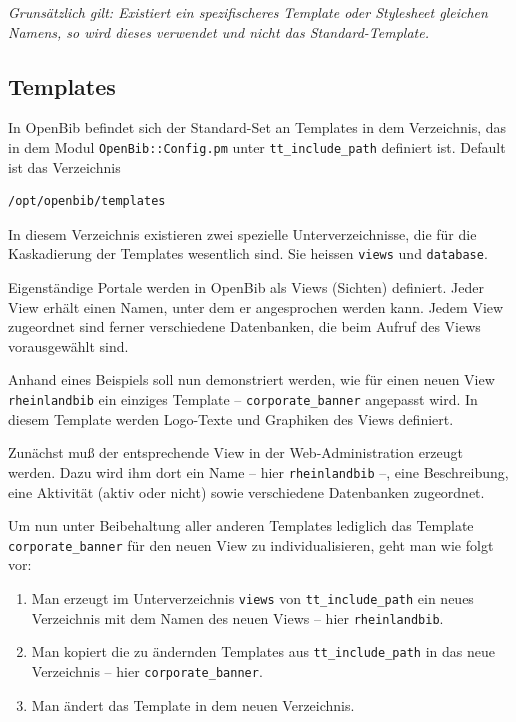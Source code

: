 \documentclass[11pt, twoside, a4paper, BCOR8mm, DIV12, bibtotoc,idxtotoc]{scrbook}
\begin{document}
\emph{Grunsätzlich gilt: Existiert ein spezifischeres Template oder
Stylesheet gleichen Namens, so wird dieses verwendet und nicht das
Standard-Template.}


\subsection{Templates}

In OpenBib befindet sich der Standard-Set an Templates in dem
Verzeichnis, das in dem Modul \texttt{OpenBib::Config.pm} unter
\texttt{tt\_include\_path} definiert ist. Default ist das Verzeichnis
\begin{verbatim}
/opt/openbib/templates
\end{verbatim} 

In diesem Verzeichnis existieren zwei
spezielle Unterverzeichnisse, die für die Kaskadierung der Templates
wesentlich sind. Sie heissen \texttt{views} und \texttt{database}.

Eigenständige Portale werden in OpenBib als Views (Sichten)
definiert. Jeder View erhält einen Namen, unter dem er angesprochen
werden kann. Jedem View zugeordnet sind ferner verschiedene
Datenbanken, die beim Aufruf des Views vorausgewählt sind.

Anhand eines Beispiels soll nun demonstriert werden, wie für einen
neuen View \texttt{rheinlandbib} ein einziges Template --
\texttt{corporate\_banner} angepasst wird. In diesem Template werden
Logo-Texte und Graphiken des Views definiert.

Zunächst muß der entsprechende View in der Web-Administration erzeugt
werden. Dazu wird ihm dort ein Name -- hier \texttt{rheinlandbib} --,
eine Beschreibung, eine Aktivität (aktiv oder nicht) sowie
verschiedene Datenbanken zugeordnet.

Um nun unter Beibehaltung aller anderen Templates lediglich das
Template \texttt{corporate\_banner} für den neuen View zu
individualisieren, geht man wie folgt vor:

\begin{enumerate}
\item Man erzeugt im Unterverzeichnis \texttt{views} von
  \texttt{tt\_include\_path} ein neues Verzeichnis mit dem Namen des neuen
  Views -- hier \texttt{rheinlandbib}.
\item Man kopiert die zu ändernden Templates aus
  \texttt{tt\_include\_path} in das neue Verzeichnis -- hier \texttt{corporate\_banner}.
\item Man ändert das Template in dem neuen Verzeichnis.
\end{enumerate}
\end{document}
